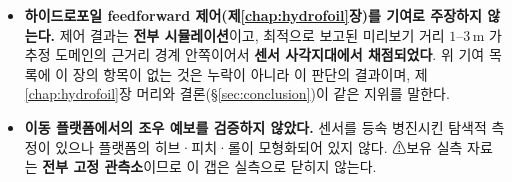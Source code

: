 \documentclass[11pt]{report}
\numberwithin{equation}{chapter}
\numberwithin{figure}{chapter}
\numberwithin{table}{chapter}
\begin{document}
\begin{itemize}
        \textbf{부호로 갈리지 않는다}(단측 $p=0.066$; 해당 배치의 사전등록 판정 밴드
        $19$--$23$ = 미결 구간 안이다).
        해석적 초기화로 표본을 두 배(72 창) 확장하여도 29/72 로 동일하다
        (\S\ref{sec:init-bank}).
  \item \textbf{하이드로포일 feedforward 제어(제\ref{chap:hydrofoil}장)를 기여로 주장하지
        않는다.} 제어 결과는 \textbf{전부 시뮬레이션}이고, 최적으로 보고된 미리보기 거리
        $1$--$3$\,m 가 추정 도메인의 근거리 경계 안쪽이어서 \textbf{센서 사각지대에서
        채점되었다}. 위 기여 목록에 이 장의 항목이 없는 것은 누락이 아니라 이 판단의 결과이며,
        제\ref{chap:hydrofoil}장 머리와 결론(\S\ref{sec:conclusion})이 같은 지위를 말한다.

  \item \textbf{이동 플랫폼에서의 조우 예보를 검증하지 않았다.} 센서를 등속 병진시킨
        탐색적 측정이 있으나 플랫폼의 히브·피치·롤이 모형화되어 있지 않다.
        ⚠보유 실측 자료는 \textbf{전부 고정 관측소}이므로 이 갭은 실측으로 닫히지 않는다.


\end{itemize}
\end{document}
